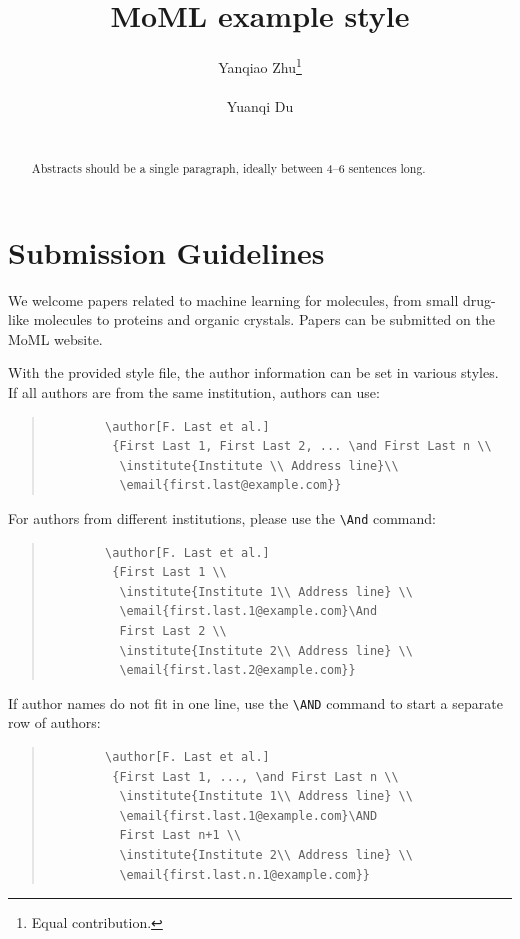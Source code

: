 \documentclass{article}
\title[MoML example style]{MoML example style}
\author[Y. Zhu et al.]{%
Yanqiao Zhu\thanks{Equal contribution.}\\
\institute{University of California, Los Angeles}\\
\email{yzhu@cs.ucla.edu}\And
Yuanqi Du\footnotemark[1]\\
\institute{Cornell University}\\
\email{yd392@cornell.edu}
}
\begin{document}
\maketitle

\begin{abstract}
Abstracts should be a single paragraph, ideally between 4--6 sentences long.
\end{abstract}

\section{Submission Guidelines}

We welcome papers related to machine learning for molecules, from small drug-like molecules to proteins and organic crystals. Papers can be submitted on the MoML website.




With the provided style file, the author information can be set in various styles.
If all authors are from the same institution, authors can use:
\begin{quote}
	\begin{verbatim}
		\author[F. Last et al.]
		 {First Last 1, First Last 2, ... \and First Last n \\
		  \institute{Institute \\ Address line}\\
		  \email{first.last@example.com}}
	\end{verbatim}
\end{quote}
For authors from different institutions, please use the \verb+\And+ command:
\begin{quote}
	\begin{verbatim}
		\author[F. Last et al.]
		 {First Last 1 \\
		  \institute{Institute 1\\ Address line} \\
		  \email{first.last.1@example.com}\And
		  First Last 2 \\
		  \institute{Institute 2\\ Address line} \\
		  \email{first.last.2@example.com}}
	\end{verbatim}
\end{quote}
If author names do not fit in one line, use the \verb+\AND+ command to start a separate row of authors:
\begin{quote}
	\begin{verbatim}
		\author[F. Last et al.]
		 {First Last 1, ..., \and First Last n \\
		  \institute{Institute 1\\ Address line} \\
		  \email{first.last.1@example.com}\AND
		  First Last n+1 \\
		  \institute{Institute 2\\ Address line} \\
		  \email{first.last.n.1@example.com}}
	\end{verbatim}
\end{quote}
\end{document}
